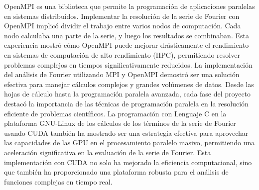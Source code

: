 OpenMPI es una biblioteca que permite la programación de aplicaciones paralelas en sistemas distribuidos. Implementar la resolución de la serie de Fourier con OpenMPI implicó dividir el trabajo entre varios nodos de computación. Cada nodo calculaba una parte de la serie, y luego los resultados se combinaban. Esta experiencia mostró cómo OpenMPI puede mejorar drásticamente el rendimiento en sistemas de computación de alto rendimiento (HPC), permitiendo resolver problemas complejos en tiempos significativamente reducidos. La implementación del análisis de Fourier utilizando MPI y OpenMPI demostró ser una solución efectiva para manejar cálculos complejos y grandes volúmenes de datos. Desde las hojas de cálculo hasta la programación paralela avanzada, cada fase del proyecto destacó la importancia de las técnicas de programación paralela en la resolución eficiente de problemas científicos. La programación con Lenguaje C en la plataforma GNU-Linux de los cálculos de los términos de la serie de Fourier usando CUDA también ha mostrado ser una estrategia efectiva para aprovechar las capacidades de las GPU en el procesamiento paralelo masivo, permitiendo una aceleración significativa en la evaluación de la serie de Fourier. Esta implementación con CUDA no solo ha mejorado la eficiencia computacional, sino que también ha proporcionado una plataforma robusta para el análisis de funciones complejas en tiempo real.
